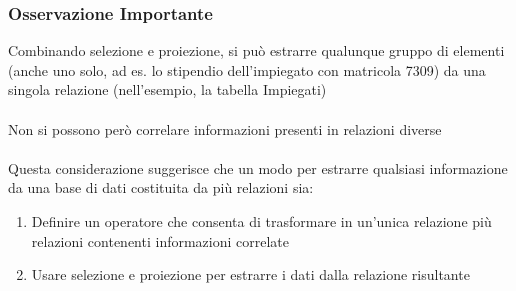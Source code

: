 \documentclass[../main.tex]{subfiles}
\begin{document}
	\subsubsection{Osservazione Importante}
	Combinando selezione e proiezione, si può estrarre qualunque gruppo di elementi (anche uno solo, ad es. lo stipendio dell’impiegato con matricola 7309) da una singola relazione (nell’esempio, la tabella Impiegati)\\\\
	Non si possono però correlare informazioni presenti in relazioni diverse\\\\
	Questa considerazione suggerisce che un modo per estrarre qualsiasi informazione da una base di dati costituita da più relazioni sia:
	\begin{enumerate}
		\item Definire un operatore che consenta di trasformare in un’unica relazione più relazioni contenenti informazioni correlate
		\item Usare selezione e proiezione per estrarre i dati dalla relazione risultante
	\end{enumerate}
\end{document}
